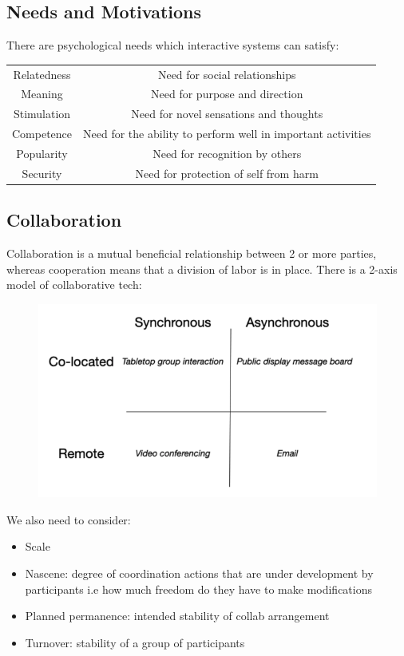 \documentclass{article}
\begin{document}
\subsection{Needs and Motivations}
There are psychological needs which interactive systems can satisfy:
\begin{center}
\begin{tabulary}{0.99\textwidth}{|C|C|}
    \hline
{} &  \\ 
                    \hline
    Relatedness & Need for social relationships \\ \hline
    Meaning & Need for purpose and direction \\ \hline
    Stimulation & Need for novel sensations and thoughts \\ \hline
    Competence & Need for the ability to perform well in important activities \\ \hline
    Popularity & Need for recognition by others \\ \hline
    Security & Need for protection of self from  harm \\ \hline
    \end{tabulary}
\end{center}
\subsection{Collaboration}
Collaboration is a mutual beneficial relationship between 2 or more parties, whereas cooperation means that a division of labor is in place. There is a 2-axis model of collaborative tech:
\begin{figure}[H]
    \centering
    \includegraphics[width=0.7\linewidth]{Pictures/Screenshot 2023-02-22 at 18.40.11.png}
\end{figure}
We also need to consider:
\begin{itemize}
    \item Scale
    \item Nascene: degree of coordination actions that are under development by participants i.e how much freedom do they have to make modifications
    \item Planned permanence: intended stability of collab arrangement
    \item Turnover: stability of a group of participants
\end{itemize}
\end{document}
